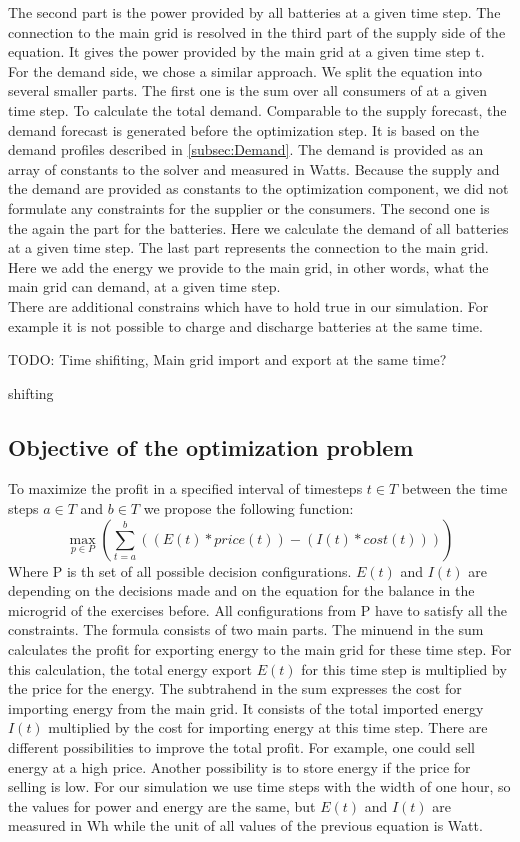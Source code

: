 The second part is the power provided by all batteries at a given time step.
The connection to the main grid is resolved in the third part of the supply side of the equation.
It gives the power provided by the main grid at a given time step t.\\
For the demand side, we chose a similar approach.
We split the equation into several smaller parts.
The first one is the sum over all consumers of at a given time step. To calculate the total demand. Comparable to the supply forecast, the demand forecast is generated before the optimization step. It is based on the demand profiles described in \cref{subsec:Demand}. The demand is provided as an array of constants to the solver and measured in Watts. Because the supply and the demand are provided as constants to the optimization component, we did not formulate any constraints for the supplier or the consumers.
The second one is the again the part for the batteries.
Here we calculate the demand of all batteries at a given time step.
The last part represents the connection to the main grid.
Here we add the energy we provide to the main grid, in other words, what the main grid can demand, at a given time step.\\

There are additional constrains which have to hold true in our simulation. 
For example it is not possible to charge and discharge batteries at the same time.

TODO: Time shifiting, Main grid import and export at the same time? 

shifting
\subsection{Objective of the optimization problem}
To maximize the profit in a specified interval of timesteps $t \in T$ between the time steps $a \in T$ and $b \in T$ we propose the following function:\\
\begin{equation} \label{eq:opt}
\max_{p \in P}{(\sum_{t=a}^{b}{((E(t)*price(t))-(I(t)*cost(t)))})}
\end{equation}
Where P is th set of all possible decision configurations. $E(t)$ and $I(t)$ are depending on the decisions made and on the equation for the balance in the microgrid of the exercises before. All configurations from P have to satisfy all the constraints. The formula consists of two main parts. The minuend in the sum calculates the profit for exporting energy to the main grid for these time step. For this calculation, the total energy export $E(t)$ for this time step is multiplied by the price for the energy. The subtrahend in the sum expresses the cost for importing energy from the main grid. It consists of the total imported energy $I(t)$ multiplied by the cost for importing energy at this time step. There are different possibilities to improve the total profit. For example, one could sell energy at a high price. Another possibility is to store energy if the price for selling is low. For our simulation we use time steps with the width of one hour, so the values for power and energy are the same, but $E(t)$ and $I(t)$ are measured in Wh while the unit of all values of the previous equation is Watt.

